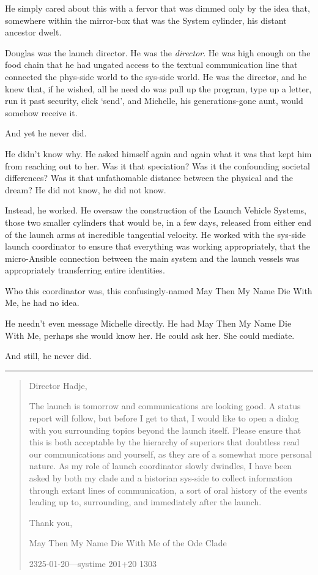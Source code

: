 He simply cared about this with a fervor that was dimmed only by the idea that, somewhere within the mirror-box that was the System cylinder, his distant ancestor dwelt.

Douglas was the launch director. He was the \emph{director}. He was high enough on the food chain that he had ungated access to the textual communication line that connected the phys-side world to the sys-side world. He was the director, and he knew that, if he wished, all he need do was pull up the program, type up a letter, run it past security, click `send', and Michelle, his generations-gone aunt, would somehow receive it.

And yet he never did.

He didn't know why. He asked himself again and again what it was that kept him from reaching out to her. Was it that speciation? Was it the confounding societal differences? Was it that unfathomable distance between the physical and the dream? He did not know, he did not know.

Instead, he worked. He oversaw the construction of the Launch Vehicle Systems, those two smaller cylinders that would be, in a few days, released from either end of the launch arms at incredible tangential velocity. He worked with the sys-side launch coordinator to ensure that everything was working appropriately, that the micro-Ansible connection between the main system and the launch vessels was appropriately transferring entire identities.

Who this coordinator was, this confusingly-named May Then My Name Die With Me, he had no idea.

He needn't even message Michelle directly. He had May Then My Name Die With Me, perhaps she would know her. He could ask her. She could mediate.

And still, he never did.

\begin{center}\rule{0.5\linewidth}{0.5pt}\end{center}

\begin{quote}
Director Hadje,

The launch is tomorrow and communications are looking good. A status report will follow, but before I get to that, I would like to open a dialog with you surrounding topics beyond the launch itself. Please ensure that this is both acceptable by the hierarchy of superiors that doubtless read our communications and yourself, as they are of a somewhat more personal nature. As my role of launch coordinator slowly dwindles, I have been asked by both my clade and a historian sys-side to collect information through extant lines of communication, a sort of oral history of the events leading up to, surrounding, and immediately after the launch.

Thank you,

May Then My Name Die With Me of the Ode Clade

2325-01-20---systime 201+20 1303
\end{quote}

